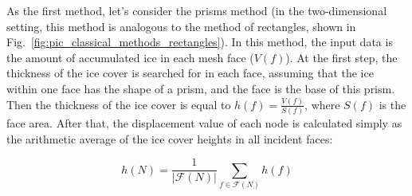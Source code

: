 \documentclass[
11pt,%
tightenlines,%
twoside,%
onecolumn,%
nofloats,%
nobibnotes,%
nofootinbib,%
superscriptaddress,%
noshowpacs,%
centertags]%
{revtex4-2}
\begin{document}
As the first method, let's consider the prisms method (in the two-dimensional setting, this method is analogous to the method of rectangles, shown in Fig.~\ref{fig:pic_classical_methods_rectangles}).
In this method, the input data is the amount of accumulated ice in each mesh face ($V(f)$).
At the first step, the thickness of the ice cover is searched for in each face, assuming that the ice within one face has the shape of a prism, and the face is the base of this prism.
Then the thickness of the ice cover is equal to $h(f) = \frac{V(f)}{S(f)}$, where $S(f)$ is the face area.
After that, the displacement value of each node is calculated simply as the arithmetic average of the ice cover heights in all incident faces:

\begin{equation}
h(N) = \frac{1}{|\mathscr{F}(N)|} \sum_{f \in \mathscr{F}(N)}{h(f)}
\end{equation}
\end{document}
